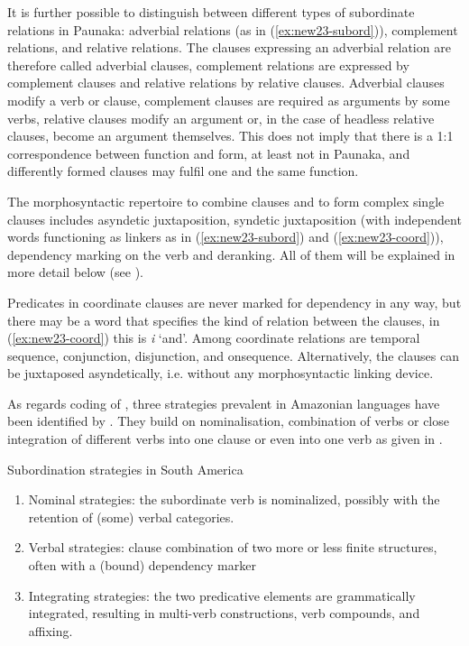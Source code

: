 It is further possible to distinguish between different types of subordinate relations in Paunaka: adverbial relations (as in (\ref{ex:new23-subord})), complement relations, and relative relations. The clauses expressing an adverbial relation are therefore called adverbial clauses, complement relations are expressed by complement clauses and relative relations by relative clauses. Adverbial clauses modify a verb or clause, complement clauses are required as arguments by some verbs, relative clauses modify an argument or, in the case of headless relative clauses, become an argument themselves. This does not imply that there is a 1:1 correspondence between function and form, at least not in Paunaka, and differently formed clauses may fulfil one and the same function.

The morphosyntactic repertoire to combine clauses and to form complex single clauses includes asyndetic juxtaposition, syndetic juxtaposition (with independent words functioning as linkers as in (\ref{ex:new23-subord}) and (\ref{ex:new23-coord})), dependency marking on the verb and deranking. All of them will be explained in more detail below (see ).

Predicates in coordinate clauses are never marked for dependency in any way, but there may be a  word that specifies the kind of relation between the clauses, in (\ref{ex:new23-coord}) this is \textit{i} ‘and’. Among coordinate relations are temporal sequence, conjunction, disjunction,  and onsequence. Alternatively, the clauses can be juxtaposed asyndetically, i.e. without any morphosyntactic linking device.

As regards coding of , three strategies prevalent in Amazonian languages have been identified by \citet[10]{Gijnetal2011}. They build on nominalisation, combination of verbs or close integration of different verbs into one clause or even into one verb as given in .


\ea
\label{exfig:SubordinationSouthAmerica}
\upshape
Subordination strategies in South America \citep[10]{Gijnetal2011}\\
\begin{enumerate}
\item Nominal strategies: the subordinate verb is nominalized, possibly with the retention of (some) verbal categories.
\item Verbal strategies: clause combination of two more or less finite structures, often with a (bound) dependency marker
\item Integrating strategies: the two predicative elements are grammatically integrated, resulting in multi-verb constructions, verb compounds, and affixing.
\end{enumerate}
\z


